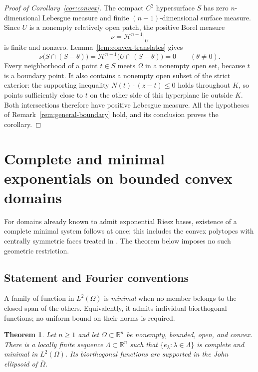 \documentclass[a4paper,12pt,reqno]{amsart}
\newtheorem{theorem}{Theorem}[section]
\theoremstyle{remark}
\numberwithin{equation}{section}
\newcommand{\R}{\mathbb R}
\begin{document}
\begin{proof}[Proof of Corollary~\ref{cor:convex}]
The compact $C^2$ hypersurface $S$ has zero $n$-dimensional Lebesgue
measure and finite $(n-1)$-dimensional surface measure. Since $U$ is a
nonempty relatively open patch, the positive Borel measure
\[
 \nu=\mathcal H^{n-1}|_U
\]
is finite and nonzero. Lemma~\ref{lem:convex-translates} gives
\[
 \nu\bigl(S\cap(S-\theta)\bigr)
 =\mathcal H^{n-1}\bigl(U\cap(S-\theta)\bigr)=0
 \qquad(\theta\ne0).
\]
Every neighborhood of a point $t\in S$ meets $\Omega$ in a nonempty
open set, because $t$ is a boundary point. It also contains a nonempty
open subset of the strict exterior: the supporting inequality
$N(t)\cdot(z-t)\leq0$ holds throughout $K$, so points sufficiently close
to $t$ on the other side of this hyperplane lie outside $K$.
Both intersections therefore have positive Lebesgue measure.
All the hypotheses of Remark~\ref{rem:general-boundary} hold, and its
conclusion proves the corollary.
\end{proof}

\section{Complete and minimal exponentials on bounded convex domains}\label{sec:complete-minimal}


For domains already known to admit exponential Riesz bases, existence
of a complete minimal system follows at once; this includes the convex
polytopes with centrally symmetric faces treated in
\cite{DebernardiLev}. The theorem below imposes no such geometric
restriction.

\subsection{Statement and Fourier conventions}
A family of function in $L^2(\Omega)$ is \emph{minimal} when
no member belongs to the closed span of the others. Equivalently,
it admits individual biorthogonal functions; no uniform bound on
their norms is required.

\begin{theorem}\label{cm:thm:main}
Let $n\geq1$ and let $\Omega\subset\R^n$ be nonempty, bounded,
open, and convex. There is a locally finite sequence $\Lambda\subset\R^n$ such that
$\{e_\lambda:\lambda\in\Lambda\}$ is complete and minimal in
$L^2(\Omega)$. Its biorthogonal functions are supported in
the John ellipsoid of $\overline\Omega$.
\end{theorem}
\end{document}

